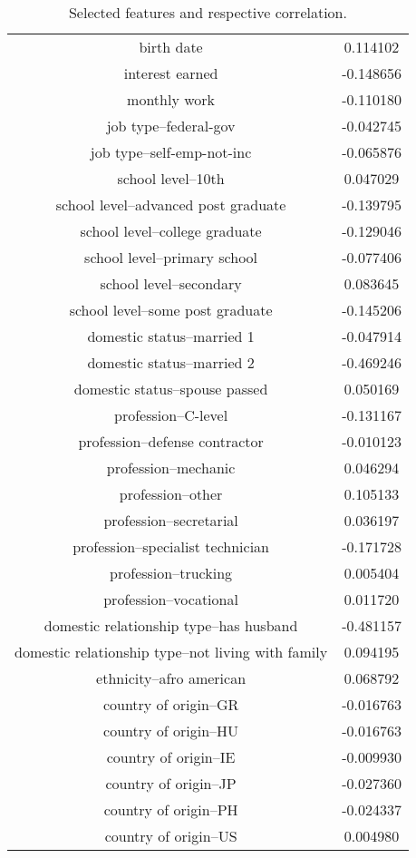\begin{table}[!h]
\caption{Selected features and respective correlation.}
\label{tab:feature-correlation}
\centering
\begin{tabular}{cc}
    birth date & 0.114102 \\
    interest earned & -0.148656 \\
    monthly work & -0.110180 \\
    job type--federal-gov & -0.042745 \\
    job type--self-emp-not-inc & -0.065876 \\
    school level--10th & 0.047029 \\
    school level--advanced post graduate & -0.139795 \\
    school level--college graduate & -0.129046 \\
    school level--primary school & -0.077406 \\
    school level--secondary & 0.083645 \\
    school level--some post graduate & -0.145206 \\
    domestic status--married 1 & -0.047914 \\
    domestic status--married 2 & -0.469246 \\
    domestic status--spouse passed & 0.050169 \\
    profession--C-level & -0.131167 \\
    profession--defense contractor & -0.010123 \\
    profession--mechanic & 0.046294 \\
    profession--other & 0.105133 \\
    profession--secretarial & 0.036197 \\
    profession--specialist technician & -0.171728 \\
    profession--trucking & 0.005404 \\
    profession--vocational & 0.011720 \\
    domestic relationship type--has husband & -0.481157 \\
    domestic relationship type--not living with family & 0.094195 \\
    ethnicity--afro american & 0.068792 \\
    country of origin--GR & -0.016763 \\
    country of origin--HU & -0.016763 \\
    country of origin--IE & -0.009930 \\
    country of origin--JP & -0.027360 \\
    country of origin--PH & -0.024337 \\
    country of origin--US & 0.004980 \\
\end{tabular}
\end{table}
